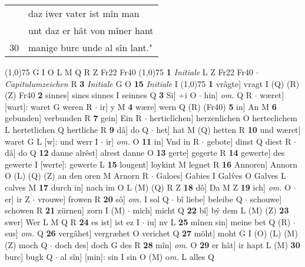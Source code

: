 \documentclass[8pt,a4paper,notitlepage]{article}
\begin{document}
\begin{table}[ht]
\begin{minipage}[t]{0.5\linewidth}
\begin{tabular}{rl}
 & daz iwer vater ist mîn man\\ 
 & unt daz er hât von mîner hant\\ 
30 & manige burc unde al sîn lant."\\ 
\end{tabular}
\scriptsize
\line(1,0){75} \newline
G I O L M Q R Z Fr22 Fr40 \newline
\line(1,0){75} \newline
\textbf{1} \textit{Initiale} L Z Fr22 Fr40   $\cdot$ \textit{Capitulumzeichen} R  \textbf{3} \textit{Initiale} G O  \textbf{15} \textit{Initiale} I  \newline
\line(1,0){75} \newline
\textbf{1} vrâgte] vragt I (Q) (R) (Z) Fr40 \textbf{2} sinnes] sines sinnes I seinnes Q \textbf{3} Si] ÷i O  $\cdot$ hin] \textit{om.} Q R  $\cdot$ wæret] [wart]: waret G weren R  $\cdot$ ir] y M \textbf{4} wære] wern Q (R) (Fr40) \textbf{5} in] An M \textbf{6} gebunden] verbunden R \textbf{7} gein] Ein R  $\cdot$ herticlîchen] herzenlichen O herteclichem L hertetlichen Q hertliche R \textbf{9} dâ] do Q  $\cdot$ het] hat M (Q) hetten R \textbf{10} und wæret] waret G L [w]: und werr I  $\cdot$ ir] \textit{om.} O \textbf{11} in] Vnd in R  $\cdot$ gebote] dinst Q diest R  $\cdot$ dâ] do Q \textbf{12} danne alrêst] alrest danne O \textbf{13} gerte] gegerte R \textbf{14} gewerte] des gewerte I [werte]: gewerte L \textbf{15} lougent] loykint M legnet R \textbf{16} Annoren] Annorn O (L) (Q) (Z) an den oren M Arnorn R  $\cdot$ Galoes] Gabies I Galv̂es O Galves L calves M \textbf{17} durch in] nach im O L (M) (Q) R Z \textbf{18} dô] Da M Z \textbf{19} ich] \textit{om.} O  $\cdot$ er] ir Z  $\cdot$ vrouwe] frowen R \textbf{20} sô] \textit{om.} I sol Q  $\cdot$ bî liebe] beleibe Q  $\cdot$ schouwe] schowen R \textbf{21} zürnen] zorn I (M)  $\cdot$ mich] micht Q \textbf{22} bî] bý dem L (M) (Z) \textbf{23} swer] Wer L M Q R \textbf{24} es ist] ist ez I  $\cdot$ iu] nv L \textbf{25} mînen sin] meine bet Q (R)  $\cdot$ sus] \textit{om.} Q \textbf{26} vergâhet] vergræhet O verichet Q \textbf{27} möht] moht G I (O) (L) (M) (Z) moch Q  $\cdot$ doch des] doch G des R \textbf{28} mîn] \textit{om.} O \textbf{29} er hât] ir hapt L (M) \textbf{30} burc] bugk Q  $\cdot$ al sîn] [min]: sin I sin O (M) o\textit{m. } L alles Q \newline
\end{minipage}
\hspace{0.5cm}
\begin{minipage}[t]{0.5\linewidth}

\end{minipage}
\end{table}
\end{document}
